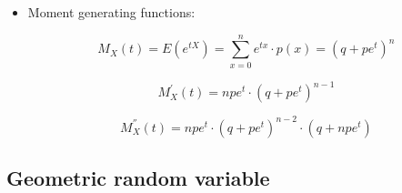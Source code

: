 \documentclass[12pt]{report}
\renewcommand{\_}{\kern-1.5pt\textunderscore\kern-1.5pt}
\begin{document}
\begin{itemize}
\begin{itemize}
	\item Moment generating functions:\par

 \[ M_{X} \left( t \right) =E \left( e^{tX} \right) = \sum _{x=0}^{n}e^{tx} \cdot p \left( x \right) = \left( q+pe^{t} \right) ^{n} \] \par

 \[ M_{X}^{'} \left( t \right) =npe^{t} \cdot  \left( q+pe^{t} \right) ^{n-1} \] \par

 \[ M_{X}^{''} \left( t \right) =npe^{t} \cdot  \left( q+pe^{t} \right) ^{n-2} \cdot  \left( q+npe^{t} \right)  \] \par


\end{itemize}
\end{itemize}\subsection*{Geometric random variable}
\end{document}
